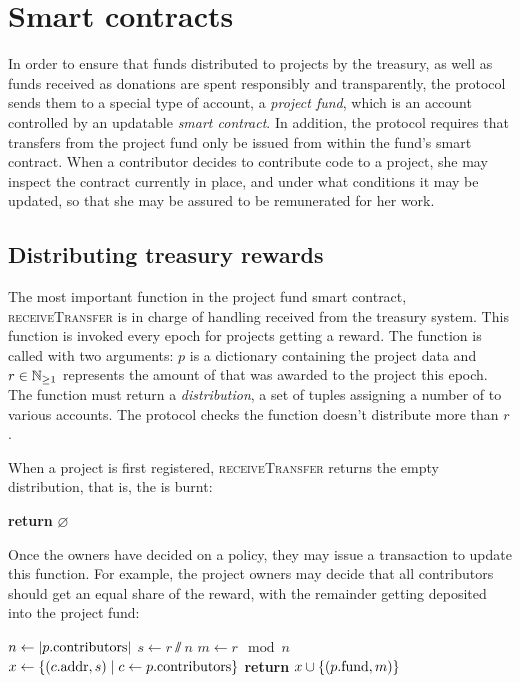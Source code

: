 
\section{Smart contracts}
\label{s:smart-contracts}

\newcommand{\handler}[1]{\textsc{\small#1}}

In order to ensure that funds distributed to projects by the \oscoin{}
treasury, as well as funds received as donations are spent responsibly and
transparently, the protocol sends them to a special type of account, a
\emph{project fund}, which is an account controlled by an updatable \emph{smart
contract}.
In addition, the protocol requires that transfers from the project fund only be
issued from within the fund's smart contract. When a contributor decides to
contribute code to a project, she may inspect the contract currently in place,
and under what conditions it may be updated, so that she may be assured to be
remunerated for her work.

\subsection{Distributing treasury rewards}

The most important function in the project fund smart contract,
\handler{receiveTransfer} is in charge of handling \oscoin{} received from the
treasury system. This function is invoked every epoch for projects getting a
reward. The function is called with two arguments: $p$ is a dictionary
containing the project data and $r \in \mathbb{N}_{\geq 1}$ represents the amount of
\oscoin{} that was awarded to the project this epoch. The function must return
a \emph{distribution}, a set of tuples assigning a number of \oscoin{} to
various accounts. The protocol checks the function doesn't distribute more than
$r$.

When a project is first registered, \handler{receiveTransfer} returns the empty
distribution, that is, the \oscoin{} is burnt:
\begin{algorithmic}[0]
        \State \textbf{return} $\varnothing$
    \EndProcedure
\end{algorithmic}

Once the owners have decided on a policy, they may issue a transaction to update
this function. For example, the project owners may decide that all contributors
should get an equal share of the reward, with the remainder getting deposited
into the project fund:
\medskip
\begin{algorithmic}[0]
        \State $n \gets |p.{\mathrm{contributors}}|$
        \State $s \gets r \sslash n$
        \State $m \gets r \mod n$
        \State $x \gets \{ (c.{\mathrm{addr}}, s) \mid c \gets p.{\mathrm{contributors}} \}$
        \State \textbf{return} $x \cup \{ (p.{\mathrm{fund}}, m) \}$
    \EndProcedure
\end{algorithmic}

